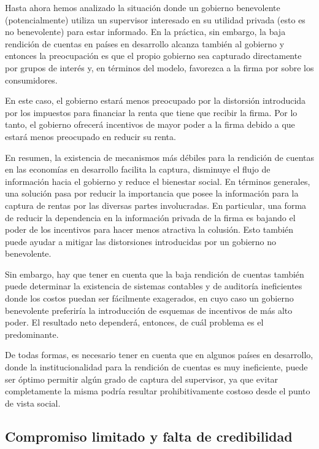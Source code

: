 \documentclass[
  12pt,
  spanish,
]{book}
\begin{document}
Hasta ahora hemos analizado la situación donde un gobierno benevolente (potencialmente) utiliza un supervisor interesado en su utilidad privada (esto es no benevolente) para estar informado. En la práctica, sin embargo, la baja rendición de cuentas en países en desarrollo alcanza también al gobierno y entonces la preocupación es que el propio gobierno sea capturado directamente por grupos de interés y, en términos del modelo, favorezca a la firma por sobre los consumidores.

En este caso, el gobierno estará menos preocupado por la distorsión introducida por los impuestos para financiar la renta que tiene que recibir la firma. Por lo tanto, el gobierno ofrecerá incentivos de mayor poder a la firma debido a que estará menos preocupado en reducir su renta.

En resumen, la existencia de mecanismos más débiles para la rendición de cuentas en las economías en desarrollo facilita la captura, disminuye el flujo de información hacia el gobierno y reduce el bienestar social. En términos generales, una solución pasa por reducir la importancia que posee la información para la captura de rentas por las diversas partes involucradas. En particular, una forma de reducir la dependencia en la información privada de la firma es bajando el poder de los incentivos para hacer menos atractiva la colusión. Esto también puede ayudar a mitigar las distorsiones introducidas por un gobierno no benevolente.

Sin embargo, hay que tener en cuenta que la baja rendición de cuentas también puede determinar la existencia de sistemas contables y de auditoría ineficientes donde los costos puedan ser fácilmente exagerados, en cuyo caso un gobierno benevolente preferiría la introducción de esquemas de incentivos de más alto poder. El resultado neto dependerá, entonces, de cuál problema es el predominante.

De todas formas, es necesario tener en cuenta que en algunos países en desarrollo, donde la institucionalidad para la rendición de cuentas es muy ineficiente, puede ser óptimo permitir algún grado de captura del supervisor, ya que evitar completamente la misma podría resultar prohibitivamente costoso desde el punto de vista social.

\hypertarget{credibilidad}{%
\subsection{Compromiso limitado y falta de credibilidad}\label{credibilidad}}
\end{document}
